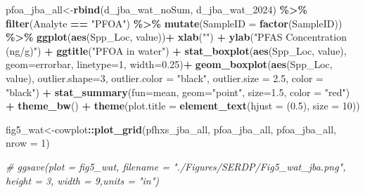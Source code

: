\documentclass[
]{article}
\newenvironment{Shaded}{\begin{snugshade}}{\end{snugshade}}
\newcommand{\AttributeTok}[1]{\textcolor[rgb]{0.13,0.29,0.53}{#1}}
\newcommand{\CommentTok}[1]{\textcolor[rgb]{0.56,0.35,0.01}{\textit{#1}}}
\newcommand{\DecValTok}[1]{\textcolor[rgb]{0.00,0.00,0.81}{#1}}
\newcommand{\FloatTok}[1]{\textcolor[rgb]{0.00,0.00,0.81}{#1}}
\newcommand{\FunctionTok}[1]{\textcolor[rgb]{0.13,0.29,0.53}{\textbf{#1}}}
\newcommand{\NormalTok}[1]{#1}
\newcommand{\OtherTok}[1]{\textcolor[rgb]{0.56,0.35,0.01}{#1}}
\newcommand{\SpecialCharTok}[1]{\textcolor[rgb]{0.81,0.36,0.00}{\textbf{#1}}}
\newcommand{\StringTok}[1]{\textcolor[rgb]{0.31,0.60,0.02}{#1}}
\begin{document}
\begin{Shaded}
\begin{Highlighting}[]
\NormalTok{pfoa\_jba\_all}\OtherTok{\textless{}{-}}\FunctionTok{rbind}\NormalTok{(d\_jba\_wat\_noSum, d\_jba\_wat\_2024) }\SpecialCharTok{\%\textgreater{}\%} 
  \FunctionTok{filter}\NormalTok{(Analyte }\SpecialCharTok{==} \StringTok{"PFOA"}\NormalTok{) }\SpecialCharTok{\%\textgreater{}\%} 
  \FunctionTok{mutate}\NormalTok{(}\AttributeTok{SampleID =} \FunctionTok{factor}\NormalTok{(SampleID)) }\SpecialCharTok{\%\textgreater{}\%} 
  \FunctionTok{ggplot}\NormalTok{(}\FunctionTok{aes}\NormalTok{(Spp\_Loc, value))}\SpecialCharTok{+}
    \FunctionTok{xlab}\NormalTok{(}\StringTok{""}\NormalTok{) }\SpecialCharTok{+}
    \FunctionTok{ylab}\NormalTok{(}\StringTok{"PFAS Concentration (ng/g)"}\NormalTok{) }\SpecialCharTok{+}
    \FunctionTok{ggtitle}\NormalTok{(}\StringTok{"PFOA in water"}\NormalTok{) }\SpecialCharTok{+}
    \FunctionTok{stat\_boxplot}\NormalTok{(}\FunctionTok{aes}\NormalTok{(Spp\_Loc, value),}
                 \AttributeTok{geom=}\StringTok{\textquotesingle{}errorbar\textquotesingle{}}\NormalTok{, }\AttributeTok{linetype=}\DecValTok{1}\NormalTok{, }\AttributeTok{width=}\FloatTok{0.25}\NormalTok{)}\SpecialCharTok{+}
    \FunctionTok{geom\_boxplot}\NormalTok{(}\FunctionTok{aes}\NormalTok{(Spp\_Loc, value),}
                 \AttributeTok{outlier.shape=}\DecValTok{3}\NormalTok{,}
                 \AttributeTok{outlier.color =} \StringTok{"black"}\NormalTok{,}
                 \AttributeTok{outlier.size =} \FloatTok{2.5}\NormalTok{,}
                 \AttributeTok{color =} \StringTok{"black"}\NormalTok{) }\SpecialCharTok{+} 
    \FunctionTok{stat\_summary}\NormalTok{(}\AttributeTok{fun=}\NormalTok{mean, }\AttributeTok{geom=}\StringTok{"point"}\NormalTok{, }\AttributeTok{size=}\FloatTok{1.5}\NormalTok{, }\AttributeTok{color =} \StringTok{"red"}\NormalTok{) }\SpecialCharTok{+}
    \FunctionTok{theme\_bw}\NormalTok{() }\SpecialCharTok{+}
    \FunctionTok{theme}\NormalTok{(}\AttributeTok{plot.title =} \FunctionTok{element\_text}\NormalTok{(}\AttributeTok{hjust =}\NormalTok{ (}\FloatTok{0.5}\NormalTok{), }\AttributeTok{size =} \DecValTok{10}\NormalTok{))}

\NormalTok{fig5\_wat}\OtherTok{\textless{}{-}}\NormalTok{cowplot}\SpecialCharTok{::}\FunctionTok{plot\_grid}\NormalTok{(pfhxs\_jba\_all, pfoa\_jba\_all, pfoa\_jba\_all, }
                   \AttributeTok{nrow =} \DecValTok{1}\NormalTok{)}

\CommentTok{\# ggsave(plot = fig5\_wat, filename = "./Figures/SERDP/Fig5\_wat\_jba.png", height = 3, width = 9,units = "in")}
\end{Highlighting}
\end{Shaded}
\end{document}
